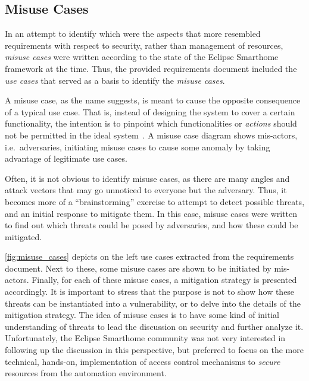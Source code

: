 \documentclass[12pt]{article}
\begin{document}
\subsection{Misuse Cases}

In an attempt to identify which were the aspects that more resembled requirements with respect to security, rather than management of resources, \emph{misuse cases} were written according to the state of the Eclipse Smarthome framework at the time. Thus, the provided requirements document included the \emph{use cases} that served as a basis to identify the \emph{misuse cases}. 

A misuse case, as the name suggests, is meant to cause the opposite consequence of a typical use case. That is, instead of designing the system to cover a certain functionality, the intention is to pinpoint which functionalities or \emph{actions} should not be permitted in the ideal system~\cite{misuse}. A misuse case diagram shows mis-actors, i.e.\ adversaries, initiating misuse cases to cause some anomaly by taking advantage of legitimate use cases.

Often, it is not obvious to identify misuse cases, as there are many angles and attack vectors that may go unnoticed to everyone but the adversary. Thus, it becomes more of a ``brainstorming'' exercise to attempt to detect possible threats, and an initial response to mitigate them. In this case, misuse cases were written to find out which threats could be posed by adversaries, and how these could be mitigated.

\autoref{fig:misuse_cases} depicts on the left use cases extracted from the requirements document. Next to these, some misuse cases are shown to be initiated by mis-actors. Finally, for each of these misuse cases, a mitigation strategy is presented accordingly. It is important to stress that the purpose is not to show how these threats can be instantiated into a vulnerability, or to delve into the details of the mitigation strategy. The idea of misuse cases is to have some kind of initial understanding of threats to lead the discussion on security and further analyze it. Unfortunately, the Eclipse Smarthome community was not very interested in following up the discussion in this perspective, but preferred to focus on the more technical, hands-on, implementation of access control mechanisms to \emph{secure} resources from the automation environment.
\end{document}

